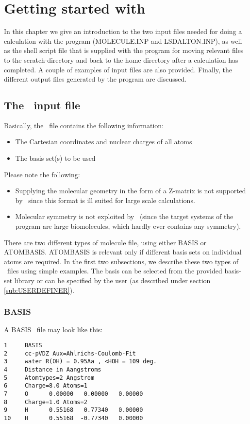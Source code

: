 \chapter{Getting started with {\lsdalton}}\label{ch:starting}

In this chapter we give an introduction to the two input files needed
for doing a calculation with the {\lsdalton} program
(MOLECULE.INP and LSDALTON.INP), as well as the
shell script file that is supplied with the program for moving
relevant files to the scratch-directory and back to the home directory
after a calculation has completed. A couple of examples of
input files  are also provided. Finally, the different output files
generated by the program are discussed.

\section{The \mol\ input file}

Basically, the \mol\ file contains the following information:
\begin{itemize}
\item The Cartesian coordinates and nuclear charges of all atoms
\item The basis set(s) to be used
\end{itemize}

Please note the following:
\begin{itemize}
\item Supplying the molecular geometry in the form of a Z-matrix 
is not supported
by \lsdalton\, since this format is ill suited for large scale 
calculations.
\item Molecular symmetry is not exploited by \lsdalton\, (since
the target systems of the program are large biomolecules, which
hardly ever contains any symmetry). 
\end{itemize}

There are two different types of molecule file, using either BASIS or ATOMBASIS.
ATOMBASIS is relevant only if different basis sets on individual atoms are required.
In the first two subsections, we describe these two types of \mol\ files using simple examples.
The basis can be selected from the provided basis-set library or can be specified by 
the user (as described under section \ref{sub:USERDEFINER}).

\subsection{BASIS}
A BASIS \mol\ file may look like this:
\begin{verbatim}
1     BASIS
2     cc-pVDZ Aux=Ahlrichs-Coulomb-Fit
3     water R(OH) = 0.95Aa , <HOH = 109 deg.
4     Distance in Aangstroms
5     Atomtypes=2 Angstrom
6     Charge=8.0 Atoms=1
7     O      0.00000   0.00000   0.00000
8     Charge=1.0 Atoms=2
9     H      0.55168   0.77340   0.00000
10    H      0.55168  -0.77340   0.00000
\end{verbatim} 

